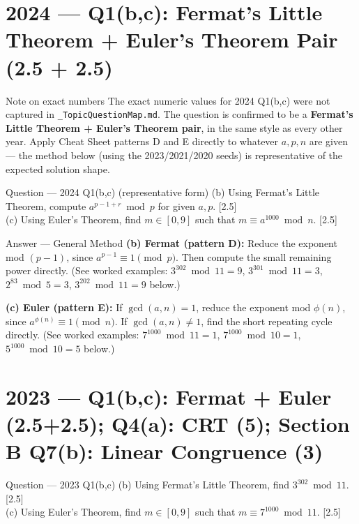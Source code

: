 \documentclass[12pt,a4paper]{article}
\begin{document}
\newpage
\section{2024 --- Q1(b,c): Fermat's Little Theorem + Euler's Theorem Pair (2.5 + 2.5)}

\begin{warnbox}{Note on exact numbers}
The exact numeric values for 2024 Q1(b,c) were not captured in \texttt{\_TopicQuestionMap.md}. The question is confirmed to be a \textbf{Fermat's Little Theorem + Euler's Theorem pair}, in the same style as every other year. Apply Cheat Sheet patterns D and E directly to whatever $a, p, n$ are given --- the method below (using the 2023/2021/2020 seeds) is representative of the expected solution shape.
\end{warnbox}

\begin{qbox}{Question --- 2024 Q1(b,c) (representative form)}
(b) Using Fermat's Little Theorem, compute $a^{p-1+r} \bmod p$ for given $a,p$. \hfill [2.5]\\
(c) Using Euler's Theorem, find $m \in [0,9]$ such that $m \equiv a^{1000} \bmod n$. \hfill [2.5]
\end{qbox}

\begin{solbox}{Answer --- General Method}
\textbf{(b) Fermat (pattern D):} Reduce the exponent mod $(p-1)$, since $a^{p-1}\equiv1\pmod p$. Then compute the small remaining power directly. (See worked examples: $3^{302}\bmod11=9$, $3^{301}\bmod11=3$, $2^{83}\bmod5=3$, $3^{202}\bmod11=9$ below.)

\textbf{(c) Euler (pattern E):} If $\gcd(a,n)=1$, reduce the exponent mod $\phi(n)$, since $a^{\phi(n)}\equiv1\pmod n$. If $\gcd(a,n)\neq1$, find the short repeating cycle directly. (See worked examples: $7^{1000}\bmod11=1$, $7^{1000}\bmod10=1$, $5^{1000}\bmod10=5$ below.)
\end{solbox}

\newpage
\section{2023 --- Q1(b,c): Fermat + Euler (2.5+2.5); Q4(a): CRT (5); Section B Q7(b): Linear Congruence (3)}

\begin{qbox}{Question --- 2023 Q1(b,c)}
(b) Using Fermat's Little Theorem, find $3^{302} \bmod 11$. \hfill [2.5]\\
(c) Using Euler's Theorem, find $m \in [0,9]$ such that $m \equiv 7^{1000} \bmod 11$. \hfill [2.5]
\end{qbox}
\end{document}
